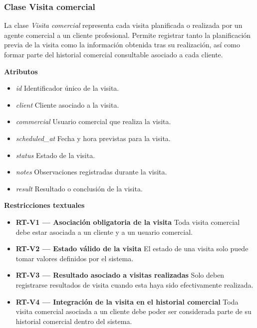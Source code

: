 \subsubsection{Clase Visita comercial}

La clase \textit{Visita comercial} representa cada visita planificada o realizada por un agente comercial a un cliente profesional. Permite registrar tanto la planificación previa de la visita como la información obtenida tras su realización, así como formar parte del historial comercial consultable asociado a cada cliente.

\textbf{Atributos}

\begin{itemize}
      \item \textit{id}
            Identificador único de la visita.
      \item \textit{client}
            Cliente asociado a la visita.
      \item \textit{commercial}
            Usuario comercial que realiza la visita.
      \item \textit{scheduled\_at}
            Fecha y hora previstas para la visita.
      \item \textit{status}
            Estado de la visita.
      \item \textit{notes}
            Observaciones registradas durante la visita.
      \item \textit{result}
            Resultado o conclusión de la visita.
\end{itemize}

\textbf{Restricciones textuales}

\begin{itemize}
      \item \textbf{RT-V1 — Asociación obligatoria de la visita}
            Toda visita comercial debe estar asociada a un cliente y a un usuario comercial.
      \item \textbf{RT-V2 — Estado válido de la visita}
            El estado de una visita solo puede tomar valores definidos por el sistema.
      \item \textbf{RT-V3 — Resultado asociado a visitas realizadas}
            Solo deben registrarse resultados de visita cuando esta haya sido efectivamente realizada.
      \item \textbf{RT-V4 — Integración de la visita en el historial comercial}
            Toda visita comercial asociada a un cliente debe poder ser considerada parte de su historial comercial dentro del sistema.
\end{itemize}

